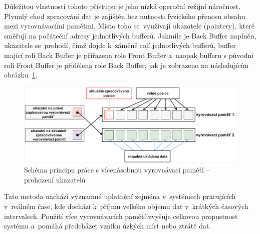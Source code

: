 Důležitou vlastností tohoto přístupu je jeho nízká operační režijní náročnost. Plynulý chod zpracování dat je zajištěn bez nutnosti fyzického přenosu obsahu mezi vyrovnávacími pamětmi. Místo toho se~využívají ukazatele (pointery), které směřují na počáteční adresy jednotlivých bufferů. Jakmile je Back Buffer naplněn, ukazatele se~prohodí, čímž dojde k~záměně rolí jednotlivých bufferů, buffer mající roli Back Buffer je přiřazena role Front Buffer a~naopak bufferu s původní rolí Front Buffer je přidělena role Back Buffer, jak je zobrazeno na následujícím obrázku~\ref{fig:multiple-buffering-2}.~\cite{buffering_chang, multiple_buffering_batch_saving, double_buffering_model}

\begin{figure}[h]
    \centering
    \includegraphics[width=1.00\textwidth]{obrazky-figures/multiple_buffering-2-2.pdf}
    
    \caption{Schéma principu práce s vícenásobnou vyrovnávací paměťí -- prohození ukazatelů}
    \label{fig:multiple-buffering-2}
\end{figure}

\newpage

Tato metoda nachází významné uplatnění zejména v~systémech pracujících v~reálném čase, kde dochází k~příjmu velkého objemu dat v~krátkých časových intervalech. Použití více vyrovnávacích pamětí zvyšuje celkovou propustnost systému a~pomáhá předcházet vzniku úzkých míst nebo ztrátě dat. ~\cite{buffering_chang, multiple_buffering_batch_saving, double_buffering_model}

